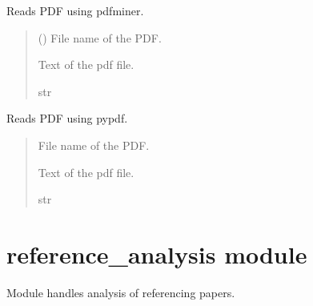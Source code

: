 \documentclass[letterpaper,10pt,english]{sphinxmanual}
\begin{document}
\begin{fulllineitems}
\label{\detokenize{pdf_utils:pdf_utils.read_pdf_pdfminer}}
\pysigstartsignatures
\pysiglinewithargsret
{}
{}
{}
\pysigstopsignatures
\sphinxAtStartPar
Reads PDF using pdfminer.
\begin{quote}\begin{description}
\sphinxAtStartPar
{} () \textendash{} File name of the PDF.

\sphinxAtStartPar
Text of the pdf file.

\sphinxAtStartPar
str

\end{description}\end{quote}

\end{fulllineitems}


\begin{fulllineitems}
\label{\detokenize{pdf_utils:pdf_utils.read_pdf_pypdf}}
\pysigstartsignatures
\pysiglinewithargsret
{}
{}
{}
\pysigstopsignatures
\sphinxAtStartPar
Reads PDF using pypdf.
\begin{quote}\begin{description}
\sphinxAtStartPar
{} \textendash{} File name of the PDF.

\sphinxAtStartPar
Text of the pdf file.

\sphinxAtStartPar
str

\end{description}\end{quote}

\end{fulllineitems}


\sphinxstepscope


\section{reference\_analysis module}
\label{\detokenize{reference_analysis:module-reference_analysis}}\label{\detokenize{reference_analysis:reference-analysis-module}}\label{\detokenize{reference_analysis::doc}}
\sphinxAtStartPar
Module handles analysis of referencing papers.
\end{document}
